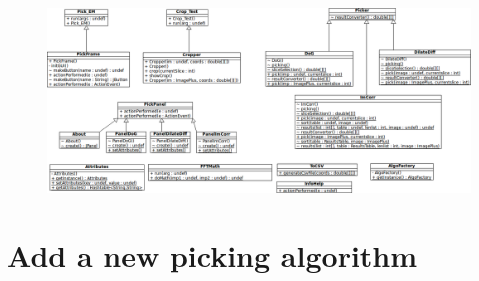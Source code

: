 \documentclass[12pt,a4paper]{report}
\begin{document}
\begin{figure}[!ht] 
\begin{center}
\includegraphics[width=1.4\textwidth, angle=90]{diagComplet.png}
\end{center}
\end{figure}

\section{Add a new picking algorithm}


\end{document}
